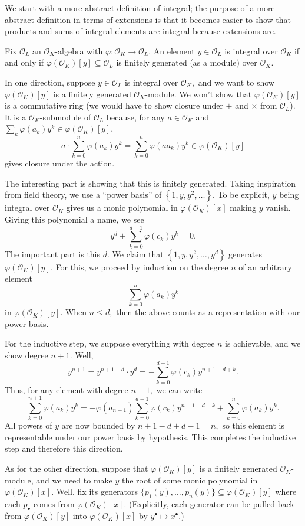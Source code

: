 We start with a more abstract definition of integral; the purpose of a more abstract definition in terms of extensions is that it becomes easier to show that products and sums of integral elements are integral because extensions are.
\begin{lemma}
    Fix $\mathcal O_L$ an $\mathcal O_K$-algebra with $\varphi:\mathcal O_K\to\mathcal O_L.$ An element $y\in\mathcal O_L$ is integral over $\mathcal O_K$ if and only if $\varphi(\mathcal O_K)[y]\subseteq\mathcal O_L$ is finitely generated (as a module) over $\mathcal O_K.$
\end{lemma}
In one direction, suppose $y\in\mathcal O_L$ is integral over $\mathcal O_K,$ and we want to show $\varphi(\mathcal O_K)[y]$ is a finitely generated $\mathcal O_K$-module. We won't show that $\varphi(\mathcal O_K)[y]$ is a commutative ring (we would have to show closure under $+$ and $\times$ from $\mathcal O_L$). It is a $\mathcal O_K$-submodule of $\mathcal O_L$ because, for any $a\in\mathcal O_K$ and $\sum_k\varphi(a_k)y^k\in\varphi(\mathcal O_K)[y],$
\[a\cdot\sum_{k=0}^n\varphi(a_k)y^k=\sum_{k=0}^n\varphi(aa_k)y^k\in\varphi(\mathcal O_K)[y]\]
gives closure under the action.

The interesting part is showing that this is finitely generated. Taking inspiration from field theory, we use a ``power basis'' of $\left\{1,y,y^2,\ldots\right\}.$ To be explicit, $y$ being integral over $\mathcal O_K$ gives us a monic polynomial in $\varphi(\mathcal O_K)[x]$ making $y$ vanish. Giving this polynomial a name, we see
\[y^d+\sum_{k=0}^{d-1}\varphi(c_k)y^k=0.\]
The important part is this $d.$ We claim that $\left\{1,y,y^2,\ldots,y^d\right\}$ generates $\varphi(\mathcal O_K)[y].$ For this, we proceed by induction on the degree $n$ of an arbitrary element
\[\sum_{k=0}^n\varphi(a_k)y^k\]
in $\varphi(\mathcal O_K)[y].$ When $n\le d,$ then the above counts as a representation with our power basis.

For the inductive step, we suppose everything with degree $n$ is achievable, and we show degree $n+1.$ Well,
\[y^{n+1}=y^{n+1-d}\cdot y^d=-\sum_{k=0}^{d-1}\varphi(c_k)y^{n+1-d+k}.\]
Thus, for any element with degree $n+1,$ we can write
\[\sum_{k=0}^{n+1}\varphi(a_k)y^k=-\varphi(a_{n+1})\sum_{k=0}^{d-1}\varphi(c_k)y^{n+1-d+k}+\sum_{k=0}^n\varphi(a_k)y^k.\]
All powers of $y$ are now bounded by $n+1-d+d-1=n,$ so this element is representable under our power basis by hypothesis. This completes the inductive step and therefore this direction.

As for the other direction, suppose that $\varphi(\mathcal O_K)[y]$ is a finitely generated $\mathcal O_K$-module, and we need to make $y$ the root of some monic polynomial in $\varphi(\mathcal O_K)[x].$ Well, fix its generators $\{p_1(y),\ldots,p_n(y)\}\subseteq\varphi(\mathcal O_K)[y]$ where each $p_\bullet$ comes from $\varphi(\mathcal O_K)[x].$ (Explicitly, each generator can be pulled back from $\varphi(\mathcal O_K)[y]$ into $\varphi(\mathcal O_K)[x]$ by $y^\bullet\mapsto x^\bullet.$)

